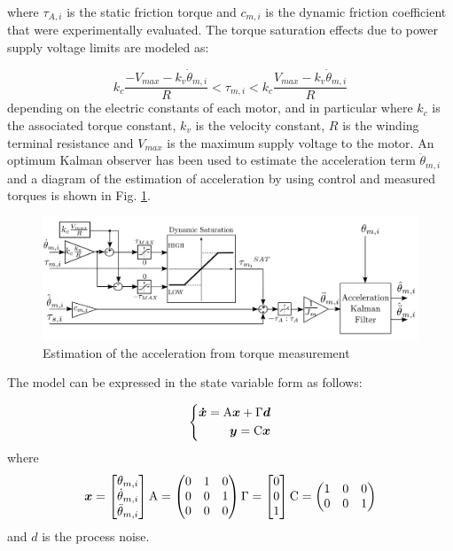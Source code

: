 \documentclass[journal]{IEEEtran}
\newcommand{\vectmm}[1]{ {#1 }}
\newcommand{\vectm}[1]{ { {\text #1} }}
\newcommand{\vects}[1]{{\boldsymbol {#1}}}
\newcommand{\vectlong}[1]{  \begin{bmatrix} #1 \end{bmatrix} }
\newcommand{\mat}[1]{  \begin{pmatrix} #1 \end{pmatrix} }
\begin{document}
where $\tau_{A,i}$ is the static friction torque and $c_{m,i}$ is the dynamic friction coefficient that were experimentally evaluated.
The torque saturation effects due to power supply voltage limits are modeled as:

\begin{equation}
k_c\frac{-V_{max}-k_v\dot{\theta}_{m,i}}{R}<\tau_{m,i}<k_c\frac{V_{max}-k_v\dot{\theta}_{m,i}}{R}
\label{torque_saturation}
\end{equation}
depending on the electric constants of each motor, and in particular  where $k_c$ is the associated torque constant, $k_v$ is the velocity constant, $R$ is the winding terminal resistance and $V_{max}$ is the maximum supply voltage to the motor.
An optimum Kalman observer has been used to estimate the acceleration term $\ddot{\theta}_{m,i}$ and a diagram of the estimation of acceleration by using control and measured torques is shown in Fig. \ref{fig:acc_estimation}.

\begin{figure}[htb]
	\centering
	\includegraphics[width=1.0\columnwidth]{DynamicSaturation}
	\caption{Estimation of the acceleration from torque measurement}
	\label{fig:acc_estimation}
\end{figure}
%
%

The model can be expressed in the state variable form as follows:
%

\begin{equation}
\left \{
\begin{aligned}
\vects{\dot{x}}=\vectm{A}\vects{x} + \vectmm{\Gamma}\vects{d} \\
\vects{y}=\vectm{C}\vects{x}
\end{aligned}
\right .
\end{equation}
%
where
%
\begin{equation}
\begin{aligned}
\vects{x}=\vectlong{ {\theta_{m,i}} \\ \dot{\theta}_{m,i} \\ \ddot{\theta}_{m,i}}
\vectm{A}=\mat{0 & 1 & 0  \\
	0 & 0 & 1 \\
	0 & 0 & 0 }
\vectmm{\Gamma}=\vectlong{ 0 \\ 0 \\ 1}
\vectm{C}=\mat{1 & 0 & 0  \\
	0 & 0 & 1} 
\end{aligned}
\end{equation}
%
and $d$ is the process noise.
\end{document}
